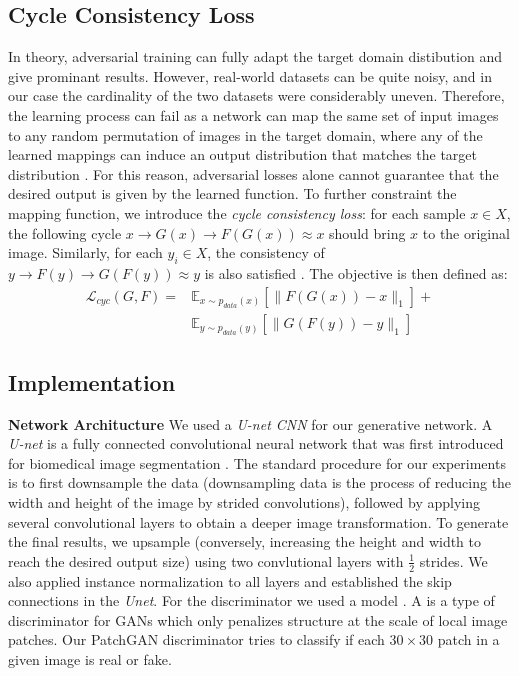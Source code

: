 \documentclass[10pt,twocolumn,letterpaper]{article}
\begin{document}
\subsection{Cycle Consistency Loss}
In theory, adversarial training can fully adapt the target domain distibution and give prominant results. However, real-world datasets can be quite noisy, and in our case the cardinality of the two datasets were considerably uneven. Therefore, the learning process can fail as a network can map the same set of input images to any random permutation of images in the target domain, where any of the learned mappings can induce an output distribution that matches the target distribution \cite{cyclegan}. For this reason, adversarial losses alone cannot guarantee that the desired output is given by the learned function. To further constraint the mapping function, we introduce the \emph{cycle consistency loss}: for each sample $x \in X$, the following cycle $x \rightarrow G(x)\rightarrow F(G(x)) \approx x$ should bring $x$ to the original image. Similarly, for each $y_{i}\in X$, the consistency of $y \rightarrow F(y)\rightarrow G(F(y)) \approx y$ is also satisfied \cite{cyclegan}. The objective is then defined as:
\begin{equation}
	\begin{split}
		\mathcal{L}_{cyc}(G,F) = & \mathbb{E}_{x \sim p_{data}(x)} [\| F(G(x))-x \| _1] + \\
				& \mathbb{E}_{y \sim p_{data}(y)} [\| G(F(y))-y \| _1]
	\end{split}
\end{equation}


\subsection{Implementation}
\textbf{Network Architucture} We used a \textit{U-net CNN} for our generative network. A \textit{U-net} is a fully connected convolutional neural network that was first introduced for biomedical image segmentation \cite{unet}. The standard procedure for our experiments is to first downsample the data (downsampling data is the process of reducing the width and height of the image by strided convolutions), followed by applying several convolutional layers to obtain a deeper image transformation. To generate the final results, we upsample (conversely, increasing the height and width to reach the desired output size) using two convlutional layers with $\frac{1}{2}$ strides. We also applied instance normalization \cite{insnorm} to all layers and established the skip connections in the \textit{Unet}. For the discriminator we used a  model \cite{patchgan}. A  is a type of discriminator for GANs which only penalizes structure at the scale of local image patches. Our PatchGAN discriminator tries to classify if each $30 \times 30$ patch in a given image is real or fake.
\end{document}
